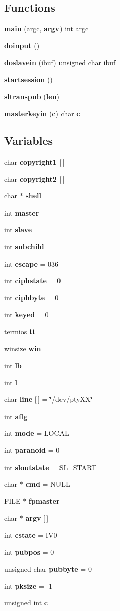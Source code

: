 \subsection*{Functions}
\begin{CompactItemize}
\item 
{\bf main} (argc, {\bf argv}) int argc
\item 
{\bf doinput} ()
\item 
{\bf doslavein} (ibuf) unsigned char ibuf
\item 
{\bf startsession} ()
\item 
{\bf sltranspub} ({\bf len})
\item 
{\bf masterkeyin} ({\bf c}) char {\bf c}
\end{CompactItemize}
\subsection*{Variables}
\begin{CompactItemize}
\item 
char {\bf copyright1} [$\,$]
\item 
char {\bf copyright2} [$\,$]
\item 
char $\ast$ {\bf shell}
\item 
int {\bf master}
\item 
int {\bf slave}
\item 
int {\bf subchild}
\item 
int {\bf escape} = 036
\item 
int {\bf ciphstate} = 0
\item 
int {\bf ciphbyte} = 0
\item 
int {\bf keyed} = 0
\item 
termios {\bf tt}
\item 
winsize {\bf win}
\item 
int {\bf lb}
\item 
int {\bf l}
\item 
char {\bf line} [$\,$] = \char`\"{}/dev/pty\-XX\char`\"{}
\item 
int {\bf aflg}
\item 
int {\bf mode} = LOCAL
\item 
int {\bf paranoid} = 0
\item 
int {\bf sloutstate} = SL\_\-START
\item 
char $\ast$ {\bf cmd} = NULL
\item 
FILE $\ast$ {\bf fpmaster}
\item 
char $\ast$ {\bf argv} [$\,$]
\item 
int {\bf cstate} = IV0
\item 
int {\bf pubpos} = 0
\item 
unsigned char {\bf pubbyte} = 0
\item 
int {\bf pksize} = -1
\item 
unsigned int {\bf c}
\end{CompactItemize}


